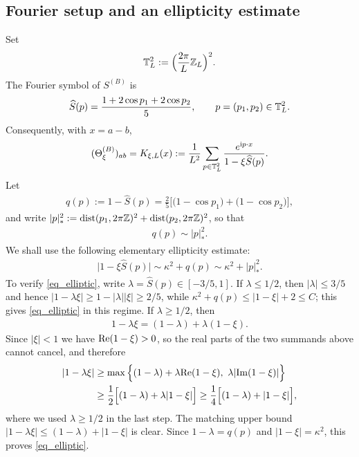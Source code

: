 \subsection{Fourier setup and an ellipticity estimate}

Set
%
\begin{align*}
\mathbb T^{2}_{L}:=\Big(\frac{2\pi}{L}\mathbb{Z}_{L}\Big)^{2}.
\end{align*}
%
The Fourier symbol of $S^{(B)}$ is
%
\begin{align}
\widehat{S}(p)=\frac{1+2\cos p_{1}+2\cos p_{2}}{5},\qquad p=(p_{1},p_{2})\in \mathbb T_{L}^{2}.\label{eq_symbol}
\end{align}
%
Consequently, with $x=a-b$,
%
\begin{align}
(\Theta^{(B)}_{\xi})_{ab}=K_{\xi,L}(x):=\frac{1}{L^{2}}\sum_{p\in\mathbb T_{L}^{2}}\frac{e^{\mathrm{i} p\cdot x}}{1-\xi\widehat{S}(p)}.\label{eq_Fourier_rep}
\end{align}
%
Let
%
\begin{align}
q(p):=1-\widehat{S}(p)=\frac{2}{5}\Big[\big(1-\cos p_{1}\big)+\big(1-\cos p_{2}\big)\Big],\label{eq_qdef}
\end{align}
%
and write $|p|_{*}^{2}:=\mathrm{dist}(p_{1},2\pi\mathbb{Z})^{2}+\mathrm{dist}(p_{2},2\pi\mathbb{Z})^{2}$, so that
%
\begin{align}
q(p)\sim|p|_{*}^{2}.\label{eq_qcomp}
\end{align}
%
We shall use the following elementary ellipticity estimate:
%
\begin{align}
\big|1-\xi\widehat{S}(p)\big|\sim\kappa^{2}+q(p)\sim\kappa^{2}+|p|_{*}^{2}.\label{eq_elliptic}
\end{align}
%
To verify \eqref{eq_elliptic}, write $\lambda=\widehat{S}(p)\in[-3/5,1]$. If $\lambda\leq1/2$, then $|\lambda|\leq3/5$ and hence $|1-\lambda\xi|\geq1-|\lambda||\xi|\geq2/5$, while $\kappa^{2}+q(p)\leq|1-\xi|+2\leq C$; this gives \eqref{eq_elliptic} in this regime. If $\lambda\geq1/2$, then
%
\begin{align*}
1-\lambda\xi=(1-\lambda)+\lambda(1-\xi).
\end{align*}
%
Since $|\xi|<1$ we have $\mathrm{Re}(1-\xi)>0$, so the real parts of the two summands above cannot cancel, and therefore
%
\begin{align*}
|1-\lambda\xi|&\geq\max\Big\{(1-\lambda)+\lambda\re(1-\xi),\ \lambda|\im(1-\xi)|\Big\}\\
&\geq\frac{1}{2}\Big[(1-\lambda)+\lambda|1-\xi|\Big]\geq\frac{1}{4}\Big[(1-\lambda)+|1-\xi|\Big],
\end{align*}
%
where we used $\lambda\geq1/2$ in the last step. The matching upper bound $|1-\lambda\xi|\leq(1-\lambda)+|1-\xi|$ is clear. Since $1-\lambda=q(p)$ and $|1-\xi|=\kappa^{2}$, this proves \eqref{eq_elliptic}.


